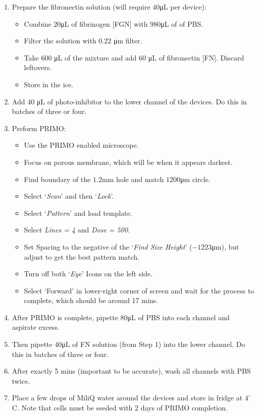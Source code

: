\begin{enumerate}
	 \setlength\itemsep{-0.1em}
	\item Prepare the fibronectin solution (will require $40  $\unit{\uL} per device):
	\begin{itemize}
		 \setlength\itemsep{-0.1em}
		\item Combine $20  $\unit{\uL} of fibrinogen [FGN] with $980  $\unit{\uL} of of PBS.
		\item Filter the solution with $0.22 $ \unit{\um} filter.
		\item Take $600$ \unit{\uL} of the mixture and add $60$ \unit{\uL} of fibronectin [FN]. Discard leftovers.
		\item Store in the ice.
	\end{itemize}
	\item Add $40$ \unit{\uL} of photo-inhibitor to the lower channel of the devices. Do this in batches of three or four.
	\item Preform PRIMO:
	\begin{itemize}
		 \setlength\itemsep{-0.1em}
		\item Use the PRIMO enabled microscope.
		\item Focus on porous membrane, which will be when it appears darkest.
		\item Find boundary of the $1.2  \unit{\mm}$ hole and match $1200  $\unit{\um} circle.
		\item Select `\textit{Scan}' and then `\textit{Lock}'.
		\item Select `\textit{\textmu Pattern}' and load template.
		\item Select \textit{Lines = 4} and \textit{Dose = 500}.
		\item Set Spacing to the negative of the `\textit{Find Size Height}' ($-1223  $\unit{\um}), but adjust to get the best pattern match.
		\item Turn off both `\textit{Eye}' Icons on the left side.
		\item Select `Forward' in lower-right corner of screen and wait for the process to complete, which should be around 17 mins.
	\end{itemize}
	\item After PRIMO is complete, pipette $80  $\unit{\uL} of PBS into each channel and aspirate excess.
	\item Then pipette $40  $\unit{\uL} of FN solution (from Step 1) into the lower channel. Do this in batches of three or four.
	\item After exactly 5 mins (important to be accurate), wash all channels with PBS twice.
	\item Place a few drops of MiliQ water around the devices and store in fridge at $4^{\circ}$C. Note that cells must be seeded with 2 days of PRIMO completion. 
\end{enumerate}

